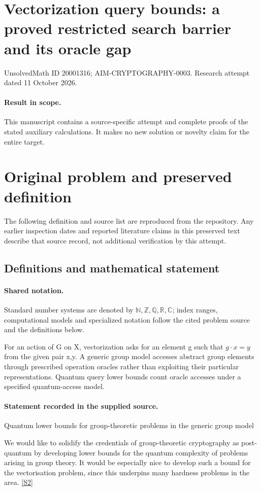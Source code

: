 \documentclass[11pt]{article}
\begin{document}
\section*{Vectorization query bounds: a proved restricted search barrier and its oracle gap}
\noindent UnsolvedMath ID 20001316; AIM-CRYPTOGRAPHY-0003. Research attempt dated 11 October 2026.
\paragraph{Result in scope.}This manuscript contains a source-specific attempt and complete proofs of the stated auxiliary calculations. It makes no new solution or novelty claim for the entire target.
\section{Original problem and preserved definition}
The following definition and source list are reproduced from the repository. Any earlier inspection dates and reported literature claims in this preserved text describe that source record, not additional verification by this attempt.
\subsection{Definitions and mathematical statement}

\paragraph{Shared notation.}Standard number systems are denoted by $\mathbb N,\mathbb Z,\mathbb Q,\mathbb R,\mathbb C$; index ranges, computational models and specialized notation follow the cited problem source and the definitions below.


For an action of G on X, vectorization asks for an element g such that $g\cdot x=y$ from the given pair x,y. A generic group model accesses abstract group elements through prescribed operation oracles rather than exploiting their particular representations. Quantum query lower bounds count oracle accesses under a specified quantum-access model.
\paragraph{Statement recorded in the supplied source.}
Quantum lower bounds for group-theoretic problems in the generic group model

We would like to solidify the credentials of group-theoretic cryptography as post-quantum by developing lower bounds for the quantum complexity of problems arising in group theory. It would be especially nice to develop such a bound for the vectorisation problem, since this underpins many hardness problems in the area. \href{http://aimpl.org/postquantgroup/1/}{[S2]}
\end{document}
